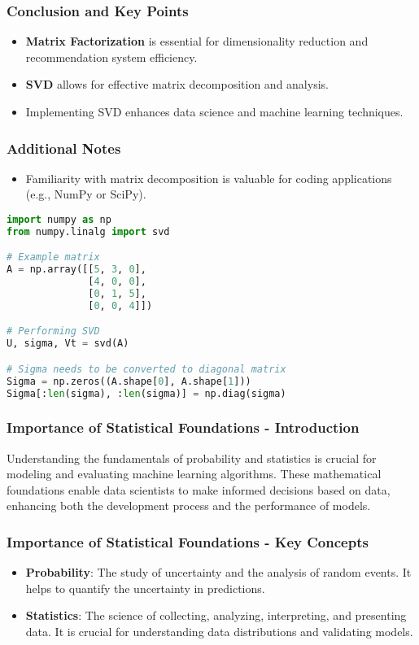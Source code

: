 \documentclass{beamer}
\begin{document}
\begin{frame}[fragile]
    \frametitle{Conclusion and Key Points}
    \begin{itemize}
        \item \textbf{Matrix Factorization} is essential for dimensionality reduction and recommendation system efficiency.
        \item \textbf{SVD} allows for effective matrix decomposition and analysis.
        \item Implementing SVD enhances data science and machine learning techniques.
    \end{itemize}
\end{frame}

\begin{frame}[fragile]
    \frametitle{Additional Notes}
    \begin{itemize}
        \item Familiarity with matrix decomposition is valuable for coding applications (e.g., NumPy or SciPy).
    \end{itemize}
    
    \begin{lstlisting}[language=Python]
import numpy as np
from numpy.linalg import svd

# Example matrix
A = np.array([[5, 3, 0],
              [4, 0, 0],
              [0, 1, 5],
              [0, 0, 4]])

# Performing SVD
U, sigma, Vt = svd(A)

# Sigma needs to be converted to diagonal matrix
Sigma = np.zeros((A.shape[0], A.shape[1]))
Sigma[:len(sigma), :len(sigma)] = np.diag(sigma)
    \end{lstlisting}
\end{frame}

\begin{frame}[fragile]
    \frametitle{Importance of Statistical Foundations - Introduction}
    Understanding the fundamentals of probability and statistics is crucial for modeling and evaluating machine learning algorithms. These mathematical foundations enable data scientists to make informed decisions based on data, enhancing both the development process and the performance of models.
\end{frame}

\begin{frame}[fragile]
    \frametitle{Importance of Statistical Foundations - Key Concepts}
    \begin{itemize}
        \item \textbf{Probability}: The study of uncertainty and the analysis of random events. It helps to quantify the uncertainty in predictions.
        \item \textbf{Statistics}: The science of collecting, analyzing, interpreting, and presenting data. It is crucial for understanding data distributions and validating models.
    \end{itemize}
\end{frame}
\end{document}
